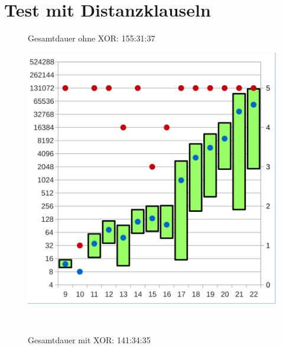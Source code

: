 \section{Test mit Distanzklauseln}


\begin{figure}[!h]
  \centering
  \begin{minipage}[c]{0.45\textwidth}
  \begin{flushleft}Gesamtdauer ohne XOR: 155:31:37\end{flushleft}
  \includegraphics[scale=0.55]{images/data_dist_knf}
  \end{minipage}
  \begin{minipage}[c]{0.09\textwidth}
  ~~
  \end{minipage}
  \begin{minipage}[c]{0.45\textwidth}
  \begin{flushleft}Gesamtdauer mit XOR: 141:34:35\end{flushleft}

\end{minipage}
\end{figure}
